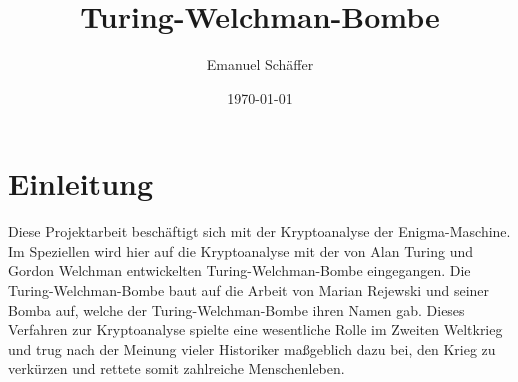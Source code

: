 \documentclass[ngerman, a4paper, footsepline, headsepline]{scrreport}
\begin{document}
	\subject{Kryptoanalyse der Enigma-Maschine durch eine Software-Nachbildung der Turing-Welchman-Bombe}
	\title{Turing-Welchman-Bombe}
	\author{Emanuel Schäffer}
	\date{\today}
	\publishers{RWU--University of Applied Sciences \\ Prof. Dipl.-Math. Ekkehard Löhmann}
	\maketitle
	
	\tableofcontents
	
	\chapter{Einleitung}\label{ch:einleitung}
	Diese Projektarbeit beschäftigt sich mit der Kryptoanalyse der Enigma-Maschine.
	Im Speziellen wird hier auf die Kryptoanalyse mit der von Alan Turing und Gordon Welchman entwickelten \glqq Turing-Welchman-Bombe\grqq{} eingegangen.
	Die Turing-Welchman-Bombe baut auf die Arbeit von Marian Rejewski und seiner \glqq Bomba\grqq{} auf, welche der Turing-Welchman-Bombe ihren Namen gab.
	Dieses Verfahren zur Kryptoanalyse spielte eine wesentliche Rolle im Zweiten Weltkrieg und trug nach der Meinung vieler Historiker maßgeblich dazu bei, den Krieg zu verkürzen und rettete somit zahlreiche Menschenleben.
	
	
	
	
	
	
	
	
	
	
%	
%	
%	
%	
	
\end{document}
